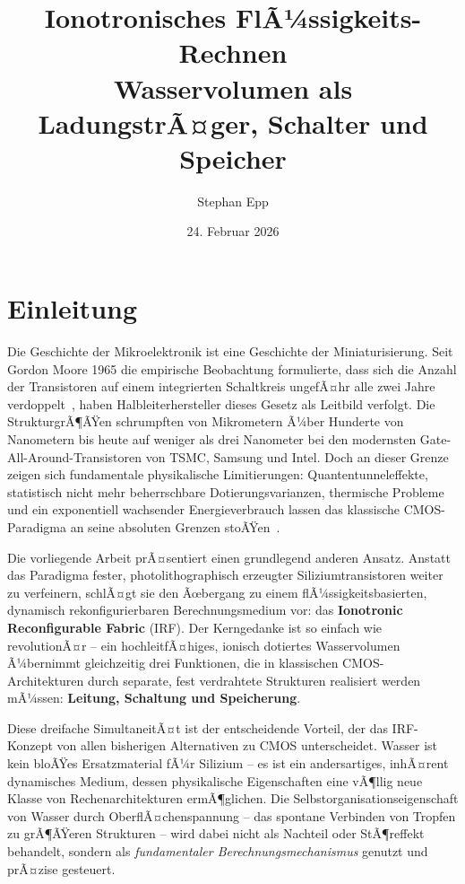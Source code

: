 ﻿\documentclass[a4paper,12pt]{scrreprt}
\title{\textbf{Ionotronisches FlÃ¼ssigkeits-Rechnen}\\
	\large Wasservolumen als LadungstrÃ¤ger, Schalter und Speicher}
\author{Stephan Epp}
\date{24. Februar 2026}
\theoremstyle{definition}
\begin{document}
	
\maketitle
\tableofcontents
\newpage

\section{Einleitung}

Die Geschichte der Mikroelektronik ist eine Geschichte der Miniaturisierung.
Seit Gordon Moore 1965 die empirische Beobachtung formulierte, dass sich die
Anzahl der Transistoren auf einem integrierten Schaltkreis ungefÃ¤hr alle zwei
Jahre verdoppelt~\cite{moore1965}, haben Halbleiterhersteller dieses Gesetz
als Leitbild verfolgt. Die StrukturgrÃ¶ÃŸen schrumpften von Mikrometern Ã¼ber
Hunderte von Nanometern bis heute auf weniger als drei Nanometer bei den
modernsten Gate-All-Around-Transistoren von TSMC, Samsung und Intel. Doch
an dieser Grenze zeigen sich fundamentale physikalische Limitierungen:
Quantentunneleffekte, statistisch nicht mehr beherrschbare Dotierungsvarianzen,
thermische Probleme und ein exponentiell wachsender Energieverbrauch lassen
das klassische CMOS-Paradigma an seine absoluten Grenzen stoÃŸen~\cite{theis2017}.

Die vorliegende Arbeit prÃ¤sentiert einen grundlegend anderen Ansatz. Anstatt
das Paradigma fester, photolithographisch erzeugter Siliziumtransistoren
weiter zu verfeinern, schlÃ¤gt sie den Ãœbergang zu einem flÃ¼ssigkeitsbasierten,
dynamisch rekonfigurierbaren Berechnungsmedium vor: das \textbf{Ionotronic
	Reconfigurable Fabric} (IRF). Der Kerngedanke ist so einfach wie revolutionÃ¤r --
ein hochleitfÃ¤higes, ionisch dotiertes Wasservolumen Ã¼bernimmt gleichzeitig
drei Funktionen, die in klassischen CMOS-Architekturen durch separate,
fest verdrahtete Strukturen realisiert werden mÃ¼ssen: \textbf{Leitung,
	Schaltung und Speicherung}.

Diese dreifache SimultaneitÃ¤t ist der entscheidende Vorteil, der das IRF-Konzept
von allen bisherigen Alternativen zu CMOS unterscheidet. Wasser ist kein bloÃŸes
Ersatzmaterial fÃ¼r Silizium -- es ist ein andersartiges, inhÃ¤rent dynamisches
Medium, dessen physikalische Eigenschaften eine vÃ¶llig neue Klasse von
Rechenarchitekturen ermÃ¶glichen. Die Selbstorganisationseigenschaft von
Wasser durch OberflÃ¤chenspannung -- das spontane Verbinden von Tropfen zu
grÃ¶ÃŸeren Strukturen -- wird dabei nicht als Nachteil oder StÃ¶reffekt behandelt,
sondern als \emph{fundamentaler Berechnungsmechanismus} genutzt und
prÃ¤zise gesteuert.
\end{document}
